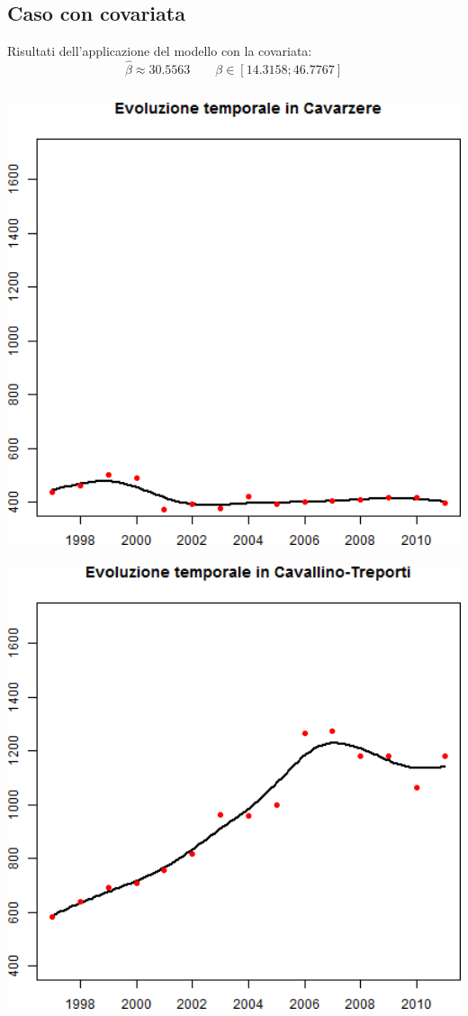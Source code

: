\documentclass[landscape,9pt]{beamer}                           %
\begin{document}
\subsection{Caso con covariata}
\begin{frame}
Risultati dell'applicazione del modello con la covariata:
$$
\hat{\beta}\approx 30.5563 \qquad \beta \in [14.3158;46.7767]
$$
\begin{columns}
	\begin{column}{0.225\textwidth}
	\includegraphics[width=1\textwidth]{Immagini/VeneziaCovar/Cavarzere.png}
	\ \
	\newline
	\includegraphics[width=1\textwidth]{Immagini/VeneziaCovar/Cavallino-Treporti.png}

\end{column}
\end{columns}
\end{frame}
\end{document}
